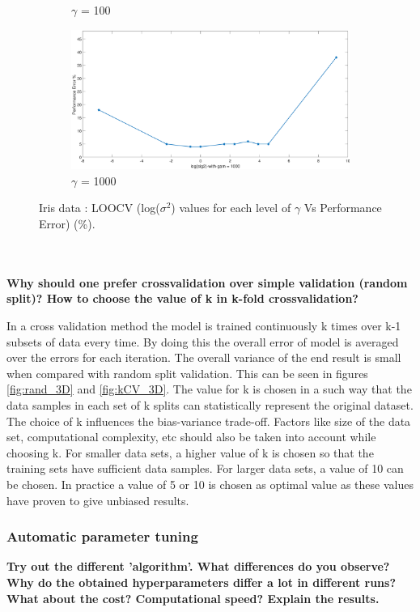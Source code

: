{\begin{figure}[!htbp]
\begin{floatrow}
{\begin{subfigure}{.3\textwidth}
				\caption{$\gamma$ = 100}
				\label{fig:loo_gamma(100)}
			\end{subfigure}%
			\begin{subfigure}{.3\textwidth}
				\includegraphics[height=0.35\linewidth,width=0.7\linewidth]{Exercise1/Report/Ex1.3_loo_gam(1000).eps}
				\caption{$\gamma$ = 1000}
				\label{fig:loo_gamma(1000)}
			\end{subfigure}%
		}{%
			\caption{Iris data : LOOCV (log($\sigma^2$) values for each level of $\gamma$ Vs Performance Error)  (\%).}\label{fig:loo_gam}
		}
	\end{floatrow}
\end{figure}\\\\
\newline
\textbf{Why should one prefer crossvalidation over simple validation (random split)? How to choose the value of k in k-fold crossvalidation?}

In a cross validation method the model is  trained continuously k times over k-1 subsets of data
every time. By doing this the overall error of model is averaged over the errors for each iteration. The overall variance of the end result is small when compared with random split validation. This can be seen in figures \ref{fig:rand_3D} and \ref{fig:kCV_3D}. The value for k is chosen in a such way that the data samples in each set of k splits can statistically represent the original dataset. The choice of k influences the bias-variance trade-off. Factors like size of the data set, computational complexity, etc should also be taken into account while choosing k. For smaller data sets, a higher value of k is chosen so that the training sets have sufficient data samples. For larger data sets, a value of 10 can be chosen. In practice a value of 5 or 10 is chosen as optimal value as these values have proven to give unbiased results.
\subsubsection{Automatic parameter tuning}
\textbf{Try out the different ’algorithm’. What differences do you observe? Why do the obtained hyperparameters differ a lot in different runs? What about the cost? Computational speed? Explain the results.}

}
